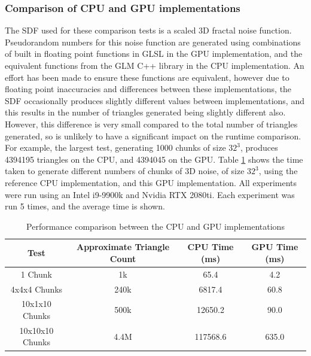 \documentclass{article}
\begin{document}
\subsubsection{Comparison of CPU and GPU implementations}
\label{section:GPUCPUcomparison}
The SDF used for these comparison tests is a scaled 3D fractal noise function. Pseudorandom numbers for this noise function are generated using combinations of built in floating point functions in GLSL in the GPU implementation, and the equivalent functions from the GLM C++ library\cite{g-truc_2005} in the CPU implementation. An effort has been made to ensure these functions are equivalent, however due to floating point inaccuracies and differences between these implementations, the SDF occasionally produces slightly different values between implementations, and this results in the number of triangles generated being slightly different also. However, this difference is very small compared to the total number of triangles generated, so is unlikely to have a significant impact on the runtime comparison. For example, the largest test, generating 1000 chunks of size $32^3$, produces 4394195 triangles on the CPU, and 4394045 on the GPU.
Table \ref{tab:cpu-gpu-comparison} shows the time taken to generate different numbers of chunks of 3D noise, of size $32^3$, using the reference CPU implementation, and this GPU implementation. All experiments were run using an Intel i9-9900k and Nvidia RTX 2080ti. Each experiment was run 5 times, and the average time is shown.
\begin{table}[H]
  \begin{tabular}{|c|c|c|c|}
    \hline
    Test & Approximate Triangle Count & CPU Time (ms) & GPU Time (ms) \\
    \hline
    \hline
    1 Chunk & 1k & 65.4 & 4.2\\
    4x4x4 Chunks & 240k & 6817.4 & 60.8\\
    10x1x10 Chunks & 500k & 12650.2 & 90.0\\
    10x10x10 Chunks & 4.4M & 117568.6 & 635.0\\
    \hline
    
  \end{tabular}
  \caption{\label{tab:cpu-gpu-comparison}Performance comparison between the CPU and GPU implementations}
\end{table}
\end{document}
